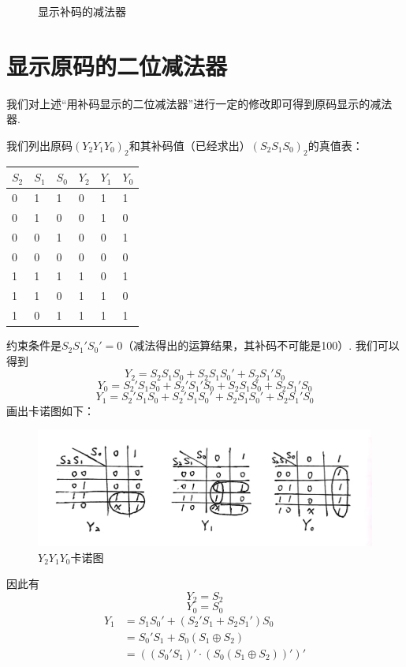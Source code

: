 \documentclass[UTF8]{ctexart}
\begin{document}
{\begin{figure}[H]
{    \vspace{-1em}
    \caption{显示补码的减法器}
    \restoregeometry
    }
\end{figure}\par
\vspace{-1em}

\section{显示原码的二位减法器}
我们对上述“用补码显示的二位减法器”进行一定的修改即可得到原码显示的减法器.\par
我们列出原码$(Y_2Y_1Y_0)_2$和其补码值（已经求出）$(S_2S_1S_0)_2$的真值表：
\begin{table}[H]
    \begin{center}
    \begin{tabular}{p{4em}<{\centering}|p{4em}<{\centering}|p{4em}<{\centering}|p{4em}<{\centering}|p{4em}<{\centering}|p{4em}<{\centering}}
        \hline\hline
        $S_2$&$S_1$&$S_0$&$Y_2$&$Y_1$&$Y_0$\\
        \hline
        0&1&1&0&1&1\\
        \hline
        0&1&0&0&1&0\\
        \hline
        0&0&1&0&0&1\\
        \hline
        0&0&0&0&0&0\\
        \hline
        1&1&1&1&0&1\\
        \hline
        1&1&0&1&1&0\\
        \hline
        1&0&1&1&1&1\\
        \hline
    \end{tabular}
\end{center}\end{table}
约束条件是$S_2S_1'S_0'=0$（减法得出的运算结果，其补码不可能是100）.
我们可以得到
\[Y_2=S_2S_1S_0+S_2S_1S_0'+S_2S_1'S_0\]
\[Y_0=S_2'S_1S_0+S_2'S_1'S_0+S_2S_1S_0+S_2S_1'S_0\]
\[Y_1=S_2'S_1S_0+S_2'S_1S_0'+S_2S_1S_0'+S_2S_1'S_0\]
画出卡诺图如下：
\begin{figure}[H]\centering
    {
        \includegraphics[scale=0.1]{6.jpg}
        \caption{$Y_2Y_1Y_0$卡诺图}
    }
\end{figure}\par
因此有
\[Y_2=S_2\]
\[Y_0=S_0\]
$$
\begin{aligned}
    Y_1&=S_1S_0'+(S_2'S_1+S_2S_1')S_0\\
    &=S_0'S_1+S_0(S_1\oplus S_2)\\
    &=((S_0'S_1)'\cdot(S_0(S_1\oplus S_2))')'
\end{aligned}
$$

}
\end{document}
